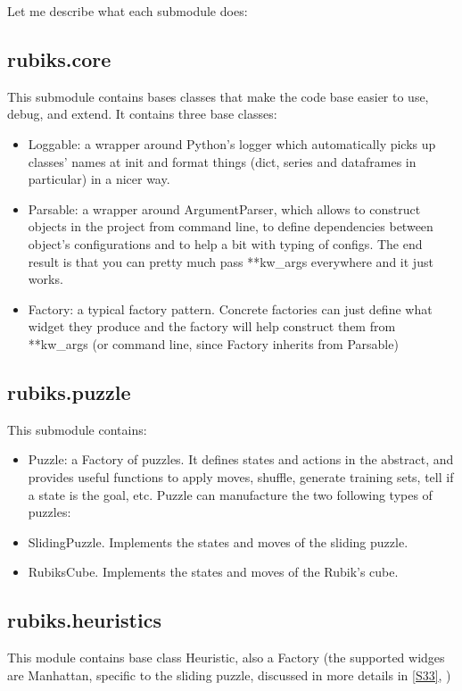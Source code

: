 Let me describe what each submodule does:

\subsection{rubiks.core}
This submodule contains bases classes that make the code base easier to use, debug, and extend. It contains three base classes:
\begin{itemize}
\item Loggable: a wrapper around Python's logger which automatically picks up classes' names at init and format things (dict, series and dataframes in particular) in a nicer way.
\item Parsable: a wrapper around ArgumentParser, which allows to construct objects in the project from command line, to define dependencies between object's configurations and to help a bit with typing of configs. The end result is that you can pretty much pass **kw\_args everywhere and it just works.
\item Factory: a typical factory pattern. Concrete factories can just define what widget they produce and the factory will help construct them from **kw\_args (or command line, since Factory inherits from Parsable)
\end{itemize}

\subsection{rubiks.puzzle}
This submodule contains:
\begin{itemize}
\item Puzzle: a Factory of puzzles. It defines states and actions in the abstract, and provides useful functions to apply moves, shuffle, generate training sets, tell if a state is the goal, etc. Puzzle can manufacture the two following types of puzzles:
\item SlidingPuzzle. Implements the states and moves of the sliding puzzle.
\item RubiksCube. Implements the states and moves of the Rubik's cube.
\end{itemize}

\subsection{rubiks.heuristics}
This module contains base class Heuristic, also a Factory (the supported widges are Manhattan, specific to the sliding puzzle, discussed in more details in \ref{S33}, )

